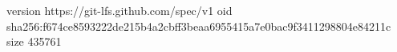 version https://git-lfs.github.com/spec/v1
oid sha256:f674ce8593222de215b4a2cbff3beaa6955415a7e0bac9f3411298804e84211c
size 435761
